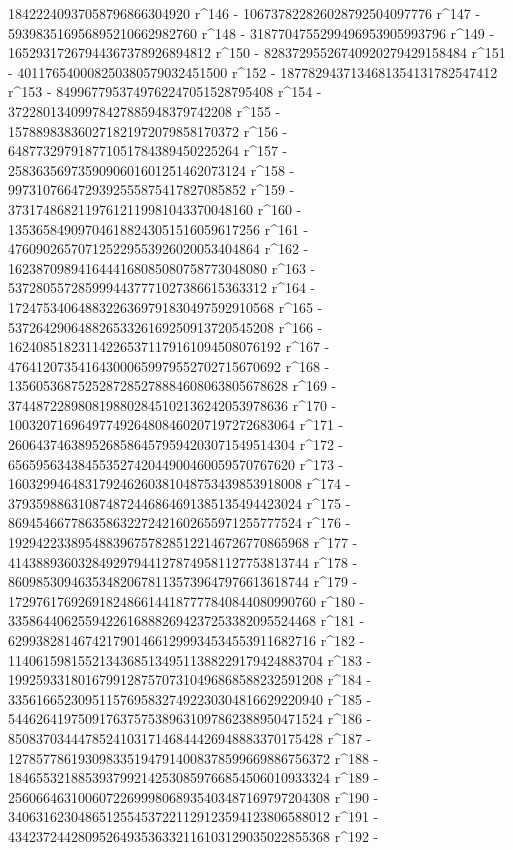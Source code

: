        18422240937058796866304920 r^146 - 
       106737822826028792504097776 r^147 - 
       593983516956895210662982760 r^148 - 
       3187704755299496953905993796 r^149 - 
       16529317267944367378926894812 r^150 - 
       82837295526740920279429158484 r^151 - 
       401176540008250380579032451500 r^152 - 
       1877829437134681354131782547412 r^153 - 
       8499677953749762247051528795408 r^154 - 
       37228013409978427885948379742208 r^155 - 
       157889838360271821972079858170372 r^156 - 
       648773297918771051784389450225264 r^157 - 
       2583635697359090601601251462073124 r^158 - 
       9973107664729392555875417827085852 r^159 - 
       37317486821197612119981043370048160 r^160 - 
       135365849097046188243051516059617256 r^161 - 
       476090265707125229553926020053404864 r^162 - 
       1623870989416444168085080758773048080 r^163 - 
       5372805572859994437771027386615363312 r^164 - 
       17247534064883226369791830497592910568 r^165 - 
       53726429064882653326169250913720545208 r^166 - 
       162408518231142265371179161094508076192 r^167 - 
       476412073541643000659979552702715670692 r^168 - 
       1356053687525287285278884608063805678628 r^169 - 
       3744872289808198802845102136242053978636 r^170 - 
       10032071696497749264808460207197272683064 r^171 - 
       26064374638952685864579594203071549514304 r^172 - 
       65659563438455352742044900460059570767620 r^173 - 
       160329946483179246260381048753439853918008 r^174 - 
       379359886310874872446864691385135494423024 r^175 - 
       869454667786358632272421602655971255777524 r^176 - 
       1929422338954883967578285122146726770865968 r^177 - 
       4143889360328492979441278749581127753813744 r^178 - 
       8609853094635348206781135739647976613618744 r^179 - 
       17297617692691824866144187777840844080990760 r^180 - 
       33586440625594226168882694237253382095524468 r^181 - 
       62993828146742179014661299934534553911682716 r^182 - 
       114061598155213436851349511388229179424883704 r^183 - 
       199259331801679912875707310496868588232591208 r^184 - 
       335616652309511576958327492230304816629220940 r^185 - 
       544626419750917637575389631097862388950471524 r^186 - 
       850837034447852410317146844426948883370175428 r^187 - 
       1278577861930983351947914008378599669886756372 r^188 - 
       1846553218853937992142530859766854506010933324 r^189 - 
       2560664631006072269998068935403487169797204308 r^190 - 
       3406316230486512554537221129123594123806588012 r^191 - 
       4342372442809526493536332116103129035022855368 r^192 - 
